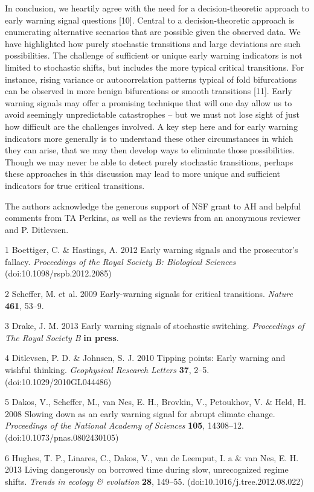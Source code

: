 \documentclass[review]{elsarticle} %
\begin{document}
In conclusion, we heartily agree with the need for a decision-theoretic
approach to early warning signal questions {[}10{]}. Central to a
decision-theoretic approach is enumerating alternative scenarios that
are possible given the observed data. We have highlighted how purely
stochastic transitions and large deviations are such possibilities. The
challenge of sufficient or unique early warning indicators is not
limited to stochastic shifts, but includes the more typical critical
transitions. For instance, rising variance or autocorrelation patterns
typical of fold bifurcations can be observed in more benign bifurcations
or smooth transitions {[}11{]}. Early warning signals may offer a
promising technique that will one day allow us to avoid seemingly
unpredictable catastrophes -- but we must not lose sight of just how
difficult are the challenges involved. A key step here and for early
warning indicators more generally is to understand these other
circumstances in which they can arise, that we may then develop ways to
eliminate those possibilities. Though we may never be able to detect
purely stochastic transitions, perhaps these approaches in this
discussion may lead to more unique and sufficient indicators for true
critical transitions.

The authors acknowledge the generous support of NSF grant to AH and
helpful comments from TA Perkins, as well as the reviews from an
anonymous reviewer and P. Ditlevsen.

1 Boettiger, C. \& Hastings, A. 2012 Early warning signals and the
prosecutor's fallacy. \emph{Proceedings of the Royal Society B:
Biological Sciences} (doi:10.1098/rspb.2012.2085)

2 Scheffer, M. et al. 2009 Early-warning signals for critical
transitions. \emph{Nature} \textbf{461}, 53--9.

3 Drake, J. M. 2013 Early warning signals of stochastic switching.
\emph{Proceedings of The Royal Society B} \textbf{in press}.

4 Ditlevsen, P. D. \& Johnsen, S. J. 2010 Tipping points: Early warning
and wishful thinking. \emph{Geophysical Research Letters} \textbf{37},
2--5. (doi:10.1029/2010GL044486)

5 Dakos, V., Scheffer, M., van Nes, E. H., Brovkin, V., Petoukhov, V. \&
Held, H. 2008 Slowing down as an early warning signal for abrupt climate
change. \emph{Proceedings of the National Academy of Sciences}
\textbf{105}, 14308--12. (doi:10.1073/pnas.0802430105)

6 Hughes, T. P., Linares, C., Dakos, V., van de Leemput, I. a \& van
Nes, E. H. 2013 Living dangerously on borrowed time during slow,
unrecognized regime shifts. \emph{Trends in ecology \& evolution}
\textbf{28}, 149--55. (doi:10.1016/j.tree.2012.08.022)
\end{document}
